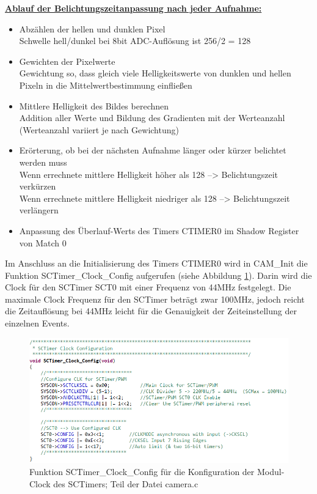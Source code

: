\textbf{\underline{Ablauf der Belichtungszeitanpassung nach jeder Aufnahme:}} 
\begin{itemize}
\item Abzählen der hellen und dunklen Pixel\\
	Schwelle hell/dunkel bei 8bit ADC-Auflösung ist 256/2 = 128
\item Gewichten der Pixelwerte\\
	Gewichtung so, dass gleich viele Helligkeitswerte von dunklen und hellen Pixeln in die Mittelwertbestimmung einfließen
\item Mittlere Helligkeit des Bildes berechnen\\
	Addition aller Werte und Bildung des Gradienten mit der Werteanzahl (Werteanzahl variiert je nach Gewichtung)
\item Erörterung, ob bei der nächsten Aufnahme länger oder kürzer belichtet werden muss\\
	Wenn errechnete mittlere Helligkeit höher als 128 --> Belichtungszeit verkürzen\\
	Wenn errechnete mittlere Helligkeit niedriger als 128 --> Belichtungszeit verlängern
\item Anpassung des Überlauf-Werts des Timers CTIMER0 im Shadow Register von Match 0\vspace{18pt}
\end{itemize}

Im Anschluss an die Initialisierung des Timers CTIMER0 wird in \glqq{}CAM\_Init\grqq{} die Funktion \glqq{}SCTimer\_Clock\_Config\grqq{} aufgerufen (siehe Abbildung \ref{fig:SCTClockConfig}). Darin wird die Clock für den SCTimer SCT0 mit einer Frequenz von 44MHz festgelegt. Die maximale Clock Frequenz für den SCTimer beträgt zwar 100MHz, jedoch reicht die Zeitauflösung bei 44MHz leicht für die Genauigkeit der Zeiteinstellung der einzelnen Events.

\begin{figure}[H] %
\includegraphics[width=\textwidth]{sec7/images/code/SCTimerClockConfig} 
\centering
\captionsetup{width=.95\textwidth}
\caption[Funktion \glqq{}SCTimer\_Clock\_Config\grqq{} aus der Datei \glqq{}camera.c\grqq{}]{Funktion \glqq{}SCTimer\_Clock\_Config\grqq{} für die Konfiguration der Modul-Clock des SCTimers; Teil der Datei \glqq{}camera.c\grqq{}}\centering
\label{fig:SCTClockConfig}
\end{figure}

